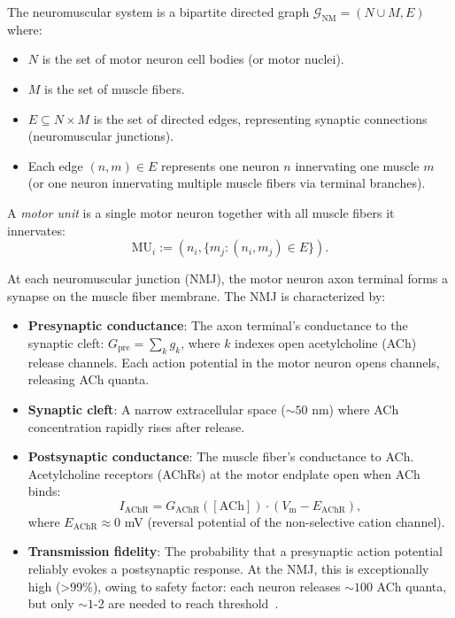 \begin{definition}
\label{def:neuromuscular-graph}
The neuromuscular system is a bipartite directed graph $\mathcal{G}_{\text{NM}} = (N \cup M, E)$ where:
\begin{itemize}[noitemsep]
\item $N$ is the set of motor neuron cell bodies (or motor nuclei).
\item $M$ is the set of muscle fibers.
\item $E \subseteq N \times M$ is the set of directed edges, representing synaptic connections (neuromuscular junctions).
\item Each edge $(n,m) \in E$ represents one neuron $n$ innervating one muscle $m$ (or one neuron innervating multiple muscle fibers via terminal branches).
\end{itemize}
\end{definition}

\begin{definition}
\label{def:motor-unit}
A \emph{motor unit} is a single motor neuron together with all muscle fibers it innervates:
\begin{equation}
  \text{MU}_i := (n_i, \{m_j : (n_i, m_j) \in E\}).
\end{equation}
\end{definition}

\begin{definition}
\label{def:nm-conductance}
At each neuromuscular junction (NMJ), the motor neuron axon terminal forms a synapse on the muscle fiber membrane. The NMJ is characterized by:
\begin{itemize}[noitemsep]
\item \textbf{Presynaptic conductance}: The axon terminal's conductance to the synaptic cleft: $G_{\text{pre}} = \sum_k g_k$, where $k$ indexes open acetylcholine (ACh) release channels. Each action potential in the motor neuron opens channels, releasing ACh quanta.

\item \textbf{Synaptic cleft}: A narrow extracellular space ($\sim 50$ nm) where ACh concentration rapidly rises after release.

\item \textbf{Postsynaptic conductance}: The muscle fiber's conductance to ACh. Acetylcholine receptors (AChRs) at the motor endplate open when ACh binds:
\begin{equation}
  I_{\text{AChR}} = G_{\text{AChR}}([\text{ACh}]) \cdot (V_{\text{m}} - E_{\text{AChR}}),
\end{equation}
where $E_{\text{AChR}} \approx 0$ mV (reversal potential of the non-selective cation channel).

\item \textbf{Transmission fidelity}: The probability that a presynaptic action potential reliably evokes a postsynaptic response. At the NMJ, this is exceptionally high (>99\%), owing to safety factor: each neuron releases $\sim 100$ ACh quanta, but only $\sim 1$-2 are needed to reach threshold~\cite{KatzFussian1957,DelcastilloKatz1954}.
\end{itemize}
\end{definition}

